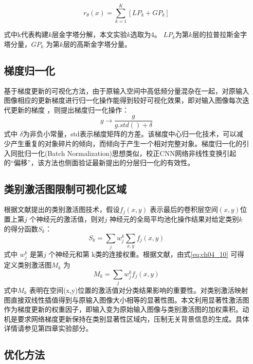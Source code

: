 \begin{equation} \label{eq:ch04_08}
       r_{\theta}(x)= \sum_{k=1}^{K}[LP_{k}+GP_{k}]
\end{equation}

式中k代表构建$k$层金字塔分解，本文实验$k$选取为4。 $LP_{k}$为第$k$层的拉普拉斯金字塔分量，$GP_{k}$ 为第$k$层的高斯金字塔分量。 


\subsection{梯度归一化}
  
	基于梯度更新的可视化方法，由于原输入空间中高低频分量混杂在一起，对原输入图像相应的更新梯度进行归一化操作能得到较好可视化效果，即对输入图像每次迭代更新的梯度 ，则提出梯度归一化操作：   
\begin{equation} \label{eq:ch04_09}
       g \rightarrow \frac{g}{g.std()+\delta}
\end{equation} 
式中 $\delta$为非负小常量，std表示梯度矩阵的方差。该梯度中心归一化技术，可以减少产生重复的对象碎片的倾向，而倾向于产生一个相对完整对象。梯度归一化的引入同批归一化(Batch Normalization)思想类似，校正CNN网络非线性变换引起的“偏移”，该方法也侧面验证最新提出的分层归一化\citep{Ioffe2014}的有效性。
\subsection{类别激活图限制可视化区域}
根据文献提出的类别激活图技术，假设$f_{j}(x,y)$  表示最后的卷积层空间$(x,y)$位置上第$j$ 个神经元的激活值，则对$j$ 神经元的全局平均池化操作结果对给定类别$k$的得分函数$S_{k}$：
\begin{equation} \label{eq:ch04_10}
      S_{k}=\sum _{j} w_{j}^{k} \sum _{x,y}f_{j}(x,y)
\end{equation}
式中 $w_{j}^{k}$ 是第$j$ 个神经元和第 k类的连接权重。根据文献，由式\ref{eq:ch04_10} 可得定义类别激活图$M_{k}$ 为	
\begin{equation} \label{eq:ch04_11}
      M_{k}=\sum _{j} w_{j}^{k}f_{j}(x,y)
\end{equation}
式中$M_{k}$ 表明在空间(x,y)位置的激活值对分类结果影响的重要性。对类别激活映射图直接双线性插值得到与原输入图像大小相等的显著性图。本文利用显著性激活图作为梯度更新的权重因子，即输入变为原始输入图像与类别激活图的加权乘积。动机是要求网络梯度更新保持在类别显著性区域内，压制无关背景信息的生成。具体详情请参见第四章实验部分。
\subsection{优化方法}

